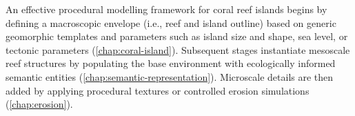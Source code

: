 An effective procedural modelling framework for coral reef islands begins by defining a macroscopic envelope (i.e., reef and island outline) based on generic geomorphic templates and parameters such as island size and shape, sea level, or tectonic parameters (\cref{chap:coral-island}). Subsequent stages instantiate mesoscale reef structures by populating the base environment with ecologically informed semantic entities (\cref{chap:semantic-representation}). Microscale details are then added by applying procedural textures or controlled erosion simulations (\cref{chap:erosion}).
















